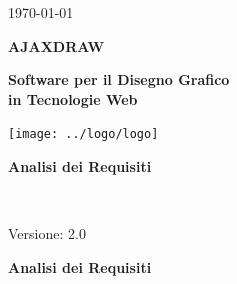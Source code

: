 \usepackage{multirow}


\renewcommand{\insertversion}{2.0} %
\renewcommand{\TITOLODOC}{Analisi dei Requisiti} %

\begin{titlepage}
\begin{center}
	\begin{Large}	\today \end{Large}
\end{center}

\vspace{20pt}

\begin{center}
	\begin{Huge}
				\textbf{AJAXDRAW}
	\end{Huge}
\end{center}			

\begin{center}
	\begin{large}
				\textbf{Software per il Disegno Grafico\\ in Tecnologie Web}
	\end{large}
\end{center}			

\vspace{20pt}

\begin{center}
\texttt{[image: ../logo/logo]}
\end{center}

\vspace{160pt}
\begin{center} %
	\begin{Huge}
				\textbf{\TITOLODOC}
	\end{Huge}
			\\
\end{center}
\vspace{200pt}
\begin{center}
Versione: \insertversion
\end{center}
\end{titlepage}

\newpage


\begin{center} %
	\begin{Huge}	
				\textbf{\TITOLODOC}
			\\
	\end{Huge}
\end{center}
\parindent=18pt %
